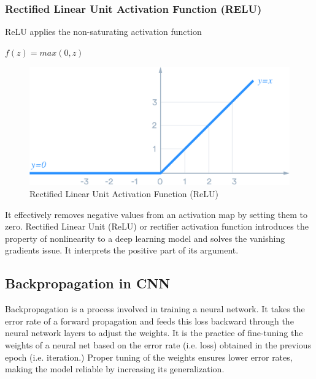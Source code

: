         \subsubsection{Rectified Linear Unit Activation Function (RELU)}
        ReLU applies the non-saturating activation function\par
        \begin{center}
            \(f(z) = max(0, z)\)    
        \end{center}

        \begin{figure}
            \centering
            \includegraphics[width=0.5\linewidth]{graphics//chapter3/relu.png}
            \caption{Rectified Linear Unit Activation Function (ReLU) }
            \label{fig:relu}
        \end{figure}
        
        It effectively removes negative values from an activation map by setting them to zero.
        Rectified Linear Unit (ReLU) or rectifier activation function introduces the property of nonlinearity to a deep learning model and solves the vanishing gradients issue. It interprets the positive part of its argument\cite{relu-0}.\par \vspace{1em}
        
    \subsection{Backpropagation in CNN}
    Backpropagation is a process involved in training a neural network. It takes the error rate of a forward propagation and feeds this loss backward through the neural network layers to adjust the weights. It is the practice of fine-tuning the weights of a neural net based on the error rate (i.e. loss) obtained in the previous epoch (i.e. iteration.) Proper tuning of the weights ensures lower error rates, making the model reliable by increasing its generalization.
